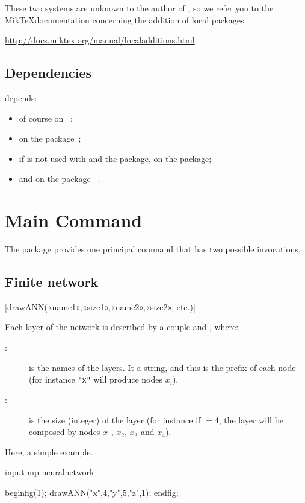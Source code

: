 \documentclass[english]{ltxdoc}
\begin{document}
These two systems are unknown to the author of \mpneural, so we
refer you to the Mik\TeX documentation concerning the addition of local packages:
\begin{center}
  \url{http://docs.miktex.org/manual/localadditions.html}
\end{center}



\subsection{Dependencies}


\mpneural depends:
\begin{itemize}
\item  of course on \MP~\cite{ctan-metapost};
\item  on the package~\cite{ctan-metaobj};
\item if \mpneural is not used with
 and the  package, on the 
package\cite{ctan-latexmp};
\item and on the package ~\cite{ctan-metapost-colorbrewer}. 
\end{itemize}
\section{Main Command}

The package \mpneural provides one principal command that has two possible
invocations. 

\subsection{Finite network}

\commande|drawANN(«name1»,«size1»,«name2»,«size2», etc.)|\smallskip{}

Each layer of the network  is described by a couple  and , where:
\begin{description}
  \item[:] is the names of the layers. It a
  string, and this is the prefix of each node (for instance \lstinline+"x"+ will
  produce nodes $x_i$).
  \item[:] is the size (integer) of the layer (for instance if
  $=4$, the layer will be composed by nodes $x_1$, $x_2$, $x_3$ and $x_4$).
\end{description}
Here, a simple example.
\begin{ExempleMP}
input mp-neuralnetwork

beginfig(1);
drawANN("x",4,"y",5,"z",1);
endfig;
\end{ExempleMP}
\end{document}
